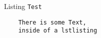 \documentclass[fragile=singleslide]{beamer}
\begin{document}
\begin{frame}[fragile]{Listing}
  \texttt{Test}
  \begin{lstlisting}
    There is some Text,
    inside of a lstlisting
  \end{lstlisting}
\end{frame}
\end{document}
